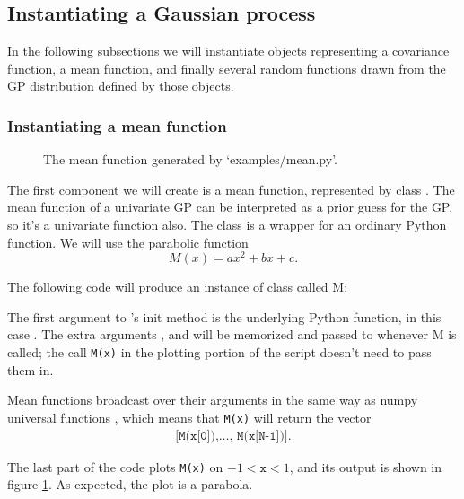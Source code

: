 \documentclass[]{manual}
\begin{document}
\subsection{Instantiating a Gaussian process}\label{sub:inst}

In the following subsections we will instantiate objects representing a covariance function, a mean function, and finally several random functions drawn from the GP distribution defined by those objects.

\subsubsection{Instantiating a mean function}\label{subsub:mean}

\begin{figure}
    \centering
    \caption{The mean function generated by {\sffamily `examples/mean.py'}.}
    \label{fig:mean}
\end{figure}

The first component we will create is a mean function, represented by class . The mean function of a univariate GP can be interpreted as a prior guess for the GP, so it's a univariate function also. The  class is a wrapper for an ordinary Python function. We will use the parabolic function
\begin{equation}
    M(x) = ax^2 + bx + c.
\end{equation}

The following code will produce an instance of class  called M:


The first argument to 's init method is the underlying Python function, in this case . The extra arguments ,   and  will be memorized and passed to  whenever M is called; the call \texttt{M(x)} in the plotting portion of the script doesn't need to pass them in.

Mean functions broadcast over their arguments in the same way as numpy universal functions \cite{numpybook}, which means that \texttt{M(x)} will return the vector 
\begin{eqnarray*}
    \texttt{[M(x[0]),\ldots, M(x[N-1])]}.
\end{eqnarray*}

The last part of the code plots \texttt{M(x)} on $-1<\texttt{x}<1$, and its output is shown in figure \ref{fig:mean}. As expected, the plot is a parabola.
\end{document}
